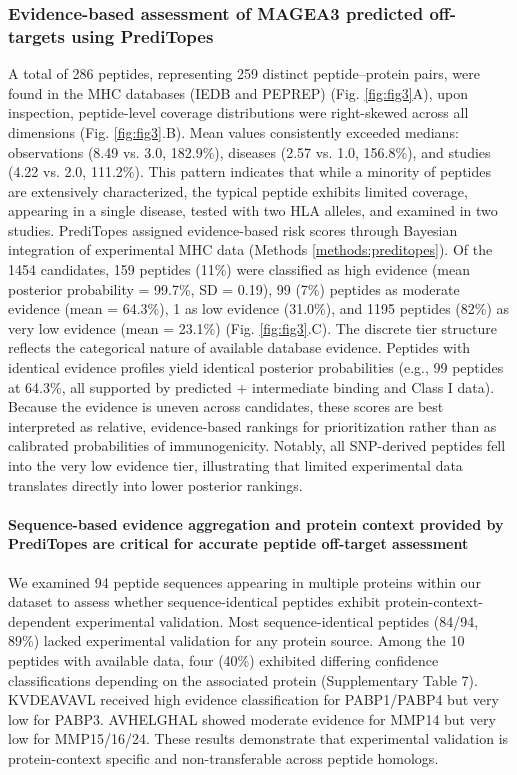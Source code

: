 \documentclass[times, twoside, watermark]{zHenriquesLab-StyleBioRxiv}
\begin{document}
            \subsubsection*{Evidence-based assessment of MAGEA3 predicted off-targets using PrediTopes}
                A total of 286 peptides, representing 259 distinct peptide–protein pairs, were found in the MHC databases (IEDB and PEPREP) (Fig. \ref{fig:fig3}A), upon inspection, peptide-level coverage distributions were right-skewed across all dimensions (Fig. \ref{fig:fig3}.B). Mean values consistently exceeded medians: observations (8.49 vs. 3.0, 182.9\%), diseases (2.57 vs. 1.0, 156.8\%), and studies (4.22 vs. 2.0, 111.2\%). This pattern indicates that while a minority of peptides are extensively characterized, the typical peptide exhibits limited coverage, appearing in a single disease, tested with two HLA alleles, and examined in two studies.
                PrediTopes assigned evidence-based risk scores through Bayesian integration of experimental MHC data (Methods \ref{methods:preditopes}). Of the 1454 candidates, 159 peptides (11\%) were classified as high evidence (mean posterior probability = 99.7\%, SD = 0.19), 99 (7\%) peptides as moderate evidence (mean = 64.3\%), 1 as low evidence (31.0\%), and 1195 peptides (82\%) as very low evidence (mean = 23.1\%) (Fig. \ref{fig:fig3}.C). 
                The discrete tier structure reflects the categorical nature of available database evidence. Peptides with identical evidence profiles yield identical posterior probabilities (e.g., 99 peptides at 64.3\%, all supported by predicted + intermediate binding and Class I data). Because the evidence is uneven across candidates, these scores are best interpreted as relative, evidence-based rankings for prioritization rather than as calibrated probabilities of immunogenicity. Notably, all SNP-derived peptides fell into the very low evidence tier, illustrating that limited experimental data translates directly into lower posterior rankings.
            \paragraph{Sequence-based evidence aggregation and protein context provided by PrediTopes are critical for accurate peptide off-target assessment}
                We examined 94 peptide sequences appearing in multiple proteins within our dataset to assess whether sequence-identical peptides exhibit protein-context-dependent experimental validation. Most sequence-identical peptides (84/94, 89\%) lacked experimental validation for any protein source. Among the 10 peptides with available data, four (40\%) exhibited differing confidence classifications depending on the associated protein (Supplementary Table 7). KVDEAVAVL received high evidence classification for PABP1/PABP4 but very low for PABP3. AVHELGHAL showed moderate evidence for MMP14 but very low for MMP15/16/24. These results demonstrate that experimental validation is protein-context specific and non-transferable across peptide homologs.
\end{document}
